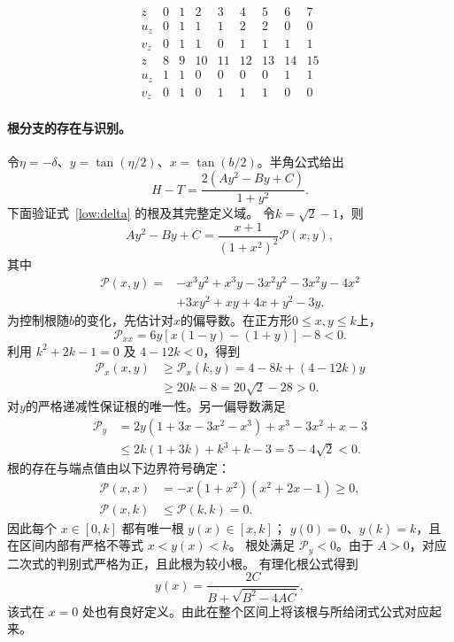 \begin{equation}
 \begin{array}{c|rrrrrrrr}
 z&0&1&2&3&4&5&6&7\\
 u_z&0&1&1&1&2&2&0&0\\
 v_z&0&1&1&0&1&1&1&1\\[2pt]
 z&8&9&10&11&12&13&14&15\\
 u_z&1&1&0&0&0&0&1&1\\
 v_z&0&1&0&1&1&1&0&0
 \end{array}
 \label{low:masks}
\end{equation}

\paragraph{根分支的存在与识别。}
令$\eta=-\delta$、$y=\tan(\eta/2)$、$x=\tan(b/2)$。半角公式给出
\begin{equation}
 H-T=\frac{2(Ay^2-By+C)}{1+y^2}.
 \label{low:quadratic-identity}
\end{equation}
下面验证式~\eqref{low:delta} 的根及其完整定义域。
令$k=\sqrt2-1$，则
\begin{equation}
 Ay^2-By+C=\frac{x+1}{(1+x^2)^2}\mathcal P(x,y),
 \label{low:halfangle-polynomial}
\end{equation}
其中
\begin{align}
 \mathcal P(x,y)={}&-x^3y^2+x^3y-3x^2y^2-3x^2y-4x^2\nonumber\\
 &+3xy^2+xy+4x+y^2-3y.
 \label{low:polynomial}
\end{align}
为控制根随$b$的变化，先估计对$x$的偏导数。在正方形$0\le x,y\le k$上，
\begin{equation}
 \mathcal P_{xx}=6y[x(1-y)-(1+y)]-8<0.
\end{equation}
利用 $k^2+2k-1=0$ 及 $4-12k<0$，得到
\begin{align}
 \mathcal P_x(x,y)&\ge \mathcal P_x(k,y)
 =4-8k+(4-12k)y\nonumber\\
 &\ge20k-8=20\sqrt2-28>0.
 \label{low:fx-positive}
\end{align}
对$y$的严格递减性保证根的唯一性。另一偏导数满足
\begin{align}
 \mathcal P_y&=2y(1+3x-3x^2-x^3)+x^3-3x^2+x-3\nonumber\\
 &\le2k(1+3k)+k^3+k-3
 =5-4\sqrt2<0.
 \label{low:fz-negative}
\end{align}
根的存在与端点值由以下边界符号确定：
\begin{align}
 \mathcal P(x,x)&=-x(1+x^2)(x^2+2x-1)\ge0,\nonumber\\
 \mathcal P(x,k)&\le \mathcal P(k,k)=0.
 \label{low:boundary}
\end{align}
因此每个 $x\in[0,k]$ 都有唯一根 $y(x)\in[x,k]$；
$y(0)=0$、$y(k)=k$，且在区间内部有严格不等式 $x<y(x)<k$。
根处满足 $\mathcal P_y<0$。由于 $A>0$，对应二次式的判别式严格为正，且此根为较小根。
有理化根公式得到
\begin{equation}
 y(x)=\frac{2C}{B+\sqrt{B^2-4AC}},
 \label{low:root-identified}
\end{equation}
该式在 $x=0$ 处也有良好定义。由此在整个区间上将该根与所给闭式公式对应起来。

